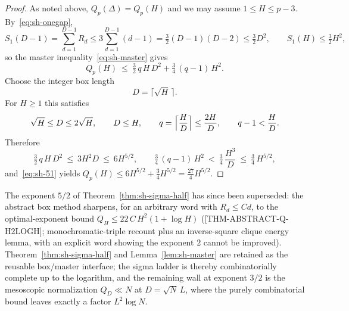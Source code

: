 \begin{proof}
As noted above, $Q_p(\Delta)=Q_p(H)$ and we may assume $1\le H\le p-3$.
By~\eqref{eq:sh-onegap},
\[
 S_1(D-1)=\sum_{d=1}^{D-1}R_d\le3\sum_{d=1}^{D-1}(d-1)
 =\tfrac32(D-1)(D-2)\le\tfrac32D^2,
 \qquad
 S_1(H)\le\tfrac32H^2 ,
\]
so the master inequality~\eqref{eq:sh-master} gives
\begin{equation}\label{eq:sh-51}
 Q_p(H)\ \le\ \tfrac32\,q\,H\,D^{2}+\tfrac34\,(q-1)\,H^{2}.
\end{equation}
Choose the integer box length
\[
 D=\bigl\lceil\sqrt H\,\bigr\rceil .
\]
For $H\ge1$ this satisfies
\[
 \sqrt H\le D\le 2\sqrt H,\qquad D\le H,\qquad
 q=\Bigl\lceil\frac HD\Bigr\rceil\le\frac{2H}{D},\qquad
 q-1<\frac HD .
\]
Therefore
\[
 \tfrac32\,q\,H\,D^{2}\ \le\ 3H^{2}D\ \le\ 6H^{5/2},
 \qquad
 \tfrac34\,(q-1)\,H^{2}\ <\ \tfrac34\,\frac{H^{3}}{D}\ \le\ \tfrac34\,H^{5/2},
\]
and~\eqref{eq:sh-51} yields
$Q_p(H)\le6H^{5/2}+\tfrac34H^{5/2}=\tfrac{27}4H^{5/2}$.
\end{proof}

\begin{remark}\label{rem:sh-superseded}
The exponent $5/2$ of Theorem~\ref{thm:sh-sigma-half} has since been
superseded: the abstract box method sharpens, for an arbitrary word with
$R_d\le Cd$, to the optimal-exponent bound
$Q_H\le 22\,C\,H^2(1+\log H)$
([THM-ABSTRACT-Q-H2LOGH]; monochromatic-triple recount plus an
inverse-square clique energy lemma, with an explicit word showing the
exponent $2$ cannot be improved).  Theorem~\ref{thm:sh-sigma-half} and
Lemma~\ref{lem:sh-master} are retained as the reusable box/master
interface; the sigma ladder is thereby combinatorially complete up to
the logarithm, and the remaining wall at exponent $3/2$ is the
mesoscopic normalization $Q_D\ll N$ at $D=\sqrt N\,L$, where the purely
combinatorial bound leaves exactly a factor $L^2\log N$.
\end{remark}


